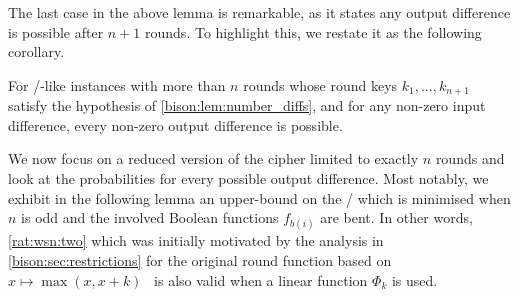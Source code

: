 The last case in the above lemma is remarkable, as it states any output difference is possible after $n+1$ rounds.
To highlight this, we restate it as the following corollary.
\begin{corollary}\label{bison:cor:no_impossible_diffs}
    For \bison/-like instances with more than $n$ rounds whose round keys $k_1, \ldots, k_{n+1}$ satisfy the hypothesis of \cref{bison:lem:number_diffs}, and for any non-zero input difference, every non-zero output difference is possible.
\end{corollary}

We now focus on a reduced version of the cipher limited to exactly $n$ rounds and look at the probabilities for every possible output difference.
Most notably, we exhibit in the following lemma an upper-bound on the \MEDP/ which is minimised when $n$ is odd and the involved Boolean functions $f_{b(i)}$ are bent.
In other words, \cref{rat:wsn:two} which was initially motivated by the analysis in \cref{bison:sec:restrictions} for the original round function based on $x \mapsto \max(x,x+k)$~\cite{AC:Tessaro15} is also valid when a linear function $\Phi_k$ is used.

